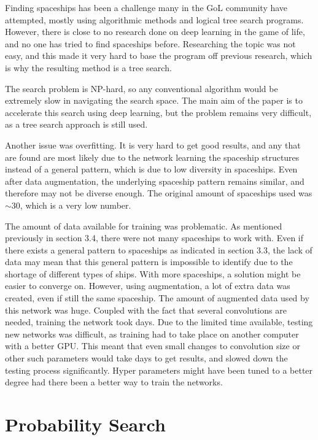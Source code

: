 \documentclass{l4proj}
\begin{document}
Finding spaceships has been a challenge many in the GoL community have attempted, mostly using algorithmic methods and logical tree search programs. However, there is close to no research done on deep learning in the game of life, and no one has tried to find spaceships before. Researching the topic was not easy, and this made it very hard to base the program off previous research, which is why the resulting method is a tree search.

The search problem is NP-hard, so any conventional algorithm would be extremely slow in navigating the search space. The main aim of the paper is to accelerate this search using deep learning, but the problem remains very difficult, as a tree search approach is still used. 

Another issue was overfitting. It is very hard to get good results, and any that are found are most likely due to the network learning the spaceship structures instead of a general pattern, which is due to low diversity in spaceships. Even after data augmentation, the underlying spaceship pattern remains similar, and therefore may not be diverse enough. The original amount of spaceships used was $\sim 30$, which is a very low number.   

The amount of data available for training was problematic. As mentioned previously in section 3.4, there were not many spaceships to work with. Even if there exists a general pattern to spaceships as indicated in section 3.3, the lack of data may mean that this general pattern is impossible to identify due to the shortage of different types of ships. With more spaceships, a solution might be easier to converge on. However, using augmentation, a lot of extra data was created, even if still the same spaceship. The amount of augmented data used by this network was huge. Coupled with the fact that several convolutions are needed, training the network took days. Due to the limited time available, testing new networks was difficult, as training had to take place on another computer with a better GPU. This meant that even small changes to convolution size or other such parameters would take days to get results, and slowed down the testing process significantly. Hyper parameters might have been tuned to a better degree had there been a better way to train the networks.


\section{Probability Search}
\end{document}
